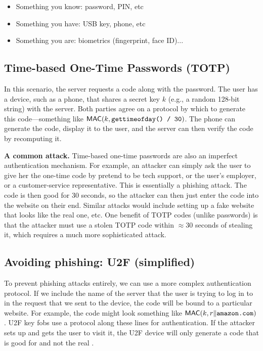 \begin{itemize}
	\item Something you know: password, PIN, etc
	\item Something you have: USB key, phone, etc
	\item Something you are: biometrics (fingerprint, face ID)...
\end{itemize}

\subsection{Time-based One-Time Passwords (TOTP)}
In this scenario, the server requests a code along
with the password. The user has a device, such as 
a phone, that shares a secret key $k$ (e.g., a random 128-bit string) 
with the server.
Both parties agree on a protocol by which to
generate this code---something like $\mathsf{MAC}(k, \texttt{gettimeofday() / 30})$.
The phone can generate the code, display it to the user, and the server
can then verify the code by recomputing it.

\textbf{A common attack.}
Time-based one-time passwords are also an imperfect authentication mechanism.
For example, an attacker can simply ask the user to give her the one-time code by pretend to be tech support, 
or the user's employer, or a customer-service representative.
This is essentially a phishing attack.
The code is then good for 30 seconds, so the attacker can then
just enter the code into the website on their end.
Similar attacks would include setting up a fake
website that looks like the real one, etc.
One benefit of TOTP codes (unlike passwords) is that the attacker
must use a stolen TOTP code within $\approx$30 seconds of stealing
it, which requires a much more sophisticated attack.

\subsection{Avoiding phishing: U2F (simplified)}
To prevent phishing attacks entirely, we can use a more complex authentication protocol.
If we include the name of the server that the user is trying to log in to in the request that we sent to the device,
the code will be bound to a particular website.
For example, the code might look something like $\MAC(k, r\|\ttt{amazon.com})$.
U2F key fobs use a protocol along these lines for authentication.
If the attacker sets up  and gets the user to visit it,
the U2F device will only generate a code that is good for 
and not the real . 
	
